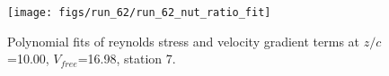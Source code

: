 \begin{figure}[H]
\centering
\texttt{[image: figs/run\_62/run\_62\_nut\_ratio\_fit]}
\caption{Polynomial fits of reynolds stress and velocity gradient terms at $z/c$=10.00, $V_{free}$=16.98, station 7.}
\label{fig:run_62_nut_ratio_fit}
\end{figure}


